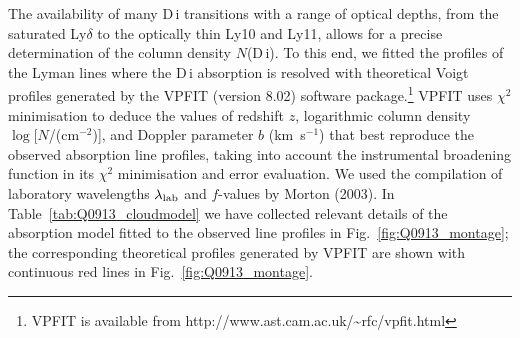 \documentclass[useAMS,usenatbib]{mn2e}
\begin{document}
The availability of many D\,{\sc i} transitions
with a range of optical depths, from the saturated
Ly$\delta$ to the optically thin Ly10 and Ly11,
allows for a precise determination of the column
density $N$(D\,{\sc i}).
To this end, we fitted the profiles of
the Lyman lines where the D\,{\sc i} absorption
is resolved with theoretical
Voigt profiles generated by the VPFIT (version 8.02)
software package.\footnote{VPFIT is available from
http://www.ast.cam.ac.uk/\textasciitilde rfc/vpfit.html}
VPFIT uses $\chi^2$ minimisation to
deduce the values of redshift $z$,
logarithmic column density $\log [N$/(cm$^{-2}$)],
and Doppler parameter $b$ (km~s$^{-1}$)
that best reproduce the observed absorption line profiles,
taking into account the
instrumental broadening function
in its $\chi^2$ minimisation and error
evaluation.
We used the compilation of laboratory
wavelengths $\lambda_{\rm lab}$
and $f$-values by Morton (2003).
In Table~\ref{tab:Q0913_cloudmodel} we have collected relevant details
of the absorption model fitted to the observed line profiles in Fig.~\ref{fig:Q0913_montage};
the corresponding theoretical  profiles generated by VPFIT are shown with continuous
red lines in Fig.~\ref{fig:Q0913_montage}.
\end{document}
